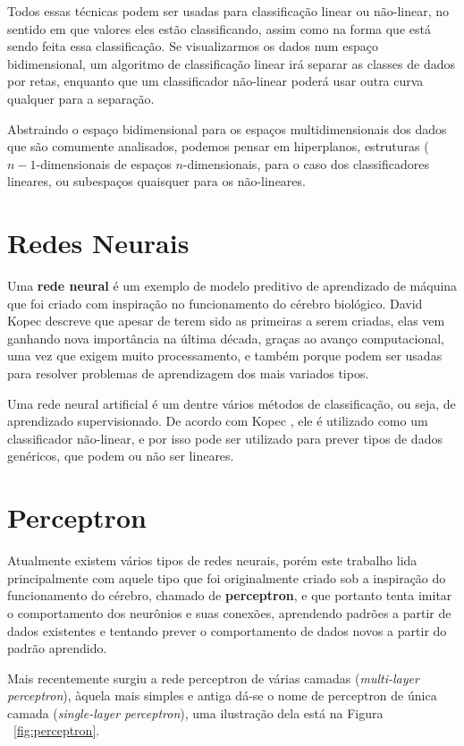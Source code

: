 \documentclass[12pt,brazil]{article}
\newcommand{\defi}[1]{\textbf{#1}}
\newcommand{\eng}[1]{\emph{#1}}
\begin{document}
Todos essas técnicas podem ser usadas para classificação linear ou não-linear, no sentido em que valores eles estão classificando, assim como na forma que está sendo feita essa classificação. Se visualizarmos os dados num espaço bidimensional, um algoritmo de classificação linear irá separar as classes de dados por retas, enquanto que um classificador não-linear poderá usar outra curva qualquer para a separação. 

Abstraindo o espaço bidimensional para os espaços multidimensionais dos dados que são comumente analisados, podemos pensar em hiperplanos, estruturas ($n{-}1$-dimensionais de espaços $n$-dimensionais, para o caso dos classificadores lineares, ou subespaços quaisquer para os não-lineares.

\section{Redes Neurais}

Uma \defi{rede neural} é um exemplo de modelo preditivo de aprendizado de máquina que foi criado com inspiração no funcionamento do cérebro biológico. David Kopec \citep{classic} descreve que apesar de terem sido as primeiras a serem criadas, elas vem ganhando nova importância na última década, graças ao avanço computacional, uma vez que exigem muito processamento, e também porque podem ser usadas para resolver problemas de aprendizagem dos mais variados tipos.

Uma rede neural artificial é um dentre vários métodos de classificação, ou seja, de aprendizado supervisionado. De acordo com Kopec \citep{classic}, ele é utilizado como um classificador não-linear, e por isso pode ser utilizado para prever tipos de dados genéricos, que podem ou não ser lineares.

\section{Perceptron}

Atualmente existem vários tipos de redes neurais, porém este trabalho lida principalmente com aquele tipo que foi originalmente criado sob a inspiração do funcionamento do cérebro, chamado de \defi{perceptron}, e que portanto tenta imitar o comportamento dos neurônios e suas conexões, aprendendo padrões a partir de dados existentes e tentando prever o comportamento de dados novos a partir do padrão aprendido.

Mais recentemente surgiu a rede perceptron de várias camadas (\eng{multi-layer perceptron}), àquela mais simples e antiga dá-se o nome de perceptron de única camada (\eng{single-layer perceptron}), uma ilustração dela está na Figura ~\ref{fig:perceptron}. 
\end{document}
